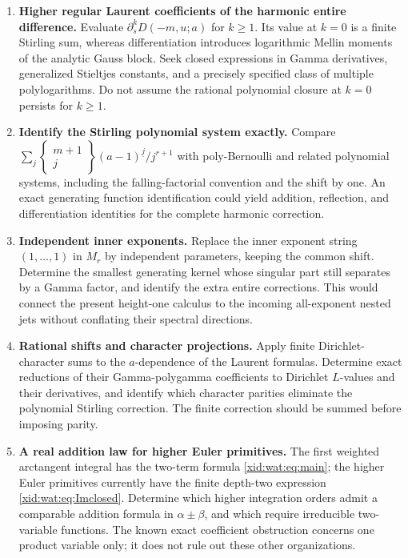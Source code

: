 \documentclass[11pt,a4paper]{article}
\numberwithin{equation}{section}
\theoremstyle{definition}
\theoremstyle{remark}
\begin{document}
\begin{enumerate}[label=\textbf{Q\arabic*.},leftmargin=*]
\item \textbf{Higher regular Laurent coefficients of the harmonic
entire difference.}
Evaluate $\partial_s^kD(-m,u;a)$ for $k\ge1$. Its value at $k=0$
is a finite Stirling sum, whereas differentiation introduces logarithmic
Mellin moments of the analytic Gauss block. Seek closed expressions in
Gamma derivatives, generalized Stieltjes constants, and a precisely
specified class of multiple polylogarithms. Do not assume the rational
polynomial closure at $k=0$ persists for $k\ge1$.

\item \textbf{Identify the Stirling polynomial system exactly.}
Compare
$\sum_j\left\{\begin{smallmatrix}m+1\\j\end{smallmatrix}\right\}
(a-1)^{\underline j}/j^{r+1}$
with poly-Bernoulli and related polynomial systems, including the
falling-factorial convention and the shift by one. An exact generating
function identification could yield addition, reflection, and
differentiation identities for the complete harmonic correction.

\item \textbf{Independent inner exponents.}
Replace the inner exponent string $(1,\ldots,1)$ in $M_r$ by independent
parameters, keeping the common shift. Determine the smallest generating
kernel whose singular part still separates by a Gamma factor, and
identify the extra entire corrections. This would connect the present
height-one calculus to the incoming all-exponent nested jets without
conflating their spectral directions.

\item \textbf{Rational shifts and character projections.}
Apply finite Dirichlet-character sums to the $a$-dependence of the
Laurent formulas. Determine exact reductions of their Gamma-polygamma
coefficients to Dirichlet $L$-values and their derivatives, and identify
which character parities eliminate the polynomial Stirling correction.
The finite correction should be summed before imposing parity.

\item \textbf{A real addition law for higher Euler primitives.}
The first weighted arctangent integral has the two-term formula
\eqref{xid:wat:eq:main}; the higher Euler primitives currently have the
finite depth-two expression \eqref{xid:wat:eq:Imclosed}. Determine which
higher integration orders admit a comparable addition formula in
$\alpha\pm\beta$, and which require irreducible two-variable functions.
The known exact coefficient obstruction concerns one product variable
only; it does not rule out these other organizations.


\end{enumerate}
\end{document}
